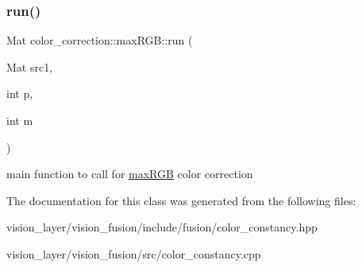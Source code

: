 \subsubsection{\texorpdfstring{run()}{run()}}
{\footnotesize\ttfamily Mat color\+\_\+correction\+::max\+R\+G\+B\+::run (\begin{DoxyParamCaption}\item[{Mat}]{src1,  }\item[{int}]{p,  }\item[{int}]{m }\end{DoxyParamCaption})}

main function to call for \hyperlink{classcolor__correction_1_1maxRGB}{max\+R\+GB} color correction 

The documentation for this class was generated from the following files\+:\begin{DoxyCompactItemize}
\item 
vision\+\_\+layer/vision\+\_\+fusion/include/fusion/color\+\_\+constancy.\+hpp\item 
vision\+\_\+layer/vision\+\_\+fusion/src/color\+\_\+constancy.\+cpp\end{DoxyCompactItemize}
